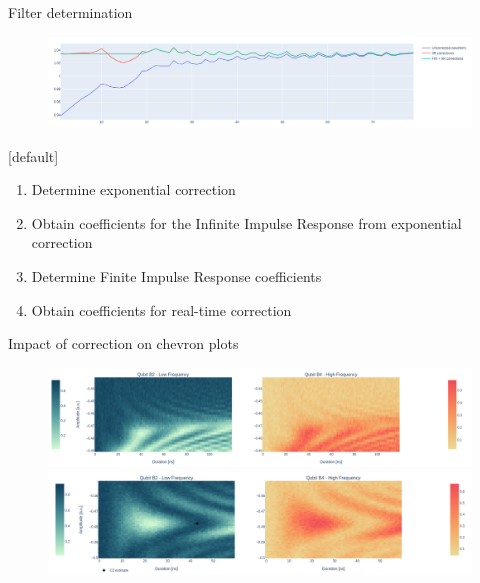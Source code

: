 \documentclass[aspectratio=169,10pt]{beamer}
\begin{document}
\begin{frame}{Filter determination}
  \begin{figure}
    \centering
    \includegraphics[width=\textwidth]{figures/B4_ringin.png}
  \end{figure}
  \vspace{0.5em}
  {[default]
    \begin{enumerate}[leftmargin=*, label=\arabic*.]
      \item Determine exponential correction
      \item Obtain coefficients for the Infinite Impulse Response from exponential correction
      \item Determine Finite Impulse Response coefficients
      \item Obtain coefficients for real-time correction
    \end{enumerate}}
\end{frame}

\begin{frame}{Impact of correction on chevron plots}
  \begin{figure}
    \centering
    \includegraphics[width=\textwidth]{figures/B2B4_nofilter.png}
    \vfill
    \includegraphics[width=\textwidth]{figures/B2B4.png}
  \end{figure}
\end{frame}
\end{document}
